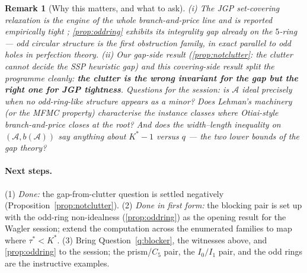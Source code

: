 \documentclass[11pt,a4paper]{article}
\newtheorem{remark}{Remark}
\newcommand{\Kstar}{K^{\ast}}
\begin{document}
\begin{remark}[Why this matters, and what to ask]
(i) The JGP set-covering relaxation is the engine of the whole
branch-and-price line and is reported empirically tight
\citep{Crama1994Column,Otiai2026}; \cref{prop:oddring} exhibits its
integrality gap already on the $5$-ring --- \emph{odd circular structure is
the first obstruction family}, in exact parallel to odd holes in perfection
theory. (ii) Our gap-side result (\cref{prop:notclutter}: the clutter cannot
decide the SSP heuristic gap) and this covering-side result split the
programme cleanly: \textbf{the clutter is the wrong invariant for the gap but
the right one for JGP tightness}. Questions for the session: is
$\mathcal{A}$ ideal precisely when no odd-ring-like structure appears as a
minor? Does Lehman's machinery (or the MFMC property) characterise the
instance classes where Otiai-style branch-and-price closes at the root? And
does the width--length inequality on $(\mathcal{A},b(\mathcal{A}))$ say
anything about $\Kstar-1$ versus $q$ --- the two lower bounds of the gap
theory?
\end{remark}

\paragraph{Next steps.} (1) \emph{Done:} the gap-from-clutter question is
settled negatively (Proposition~\ref{prop:notclutter}). (2) \emph{Done in
first form:} the blocking pair is set up with the odd-ring non-idealness
(\cref{prop:oddring}) as the opening result for the Wagler session; extend
the computation across the enumerated families to map where $\tau^*<\Kstar$.
(3) Bring Question~\ref{q:blocker}, the witnesses above, and
\cref{prop:oddring} to the session; the prism/$C_5$ pair, the $I_0/I_1$ pair,
and the odd rings are the instructive examples.



\end{document}
